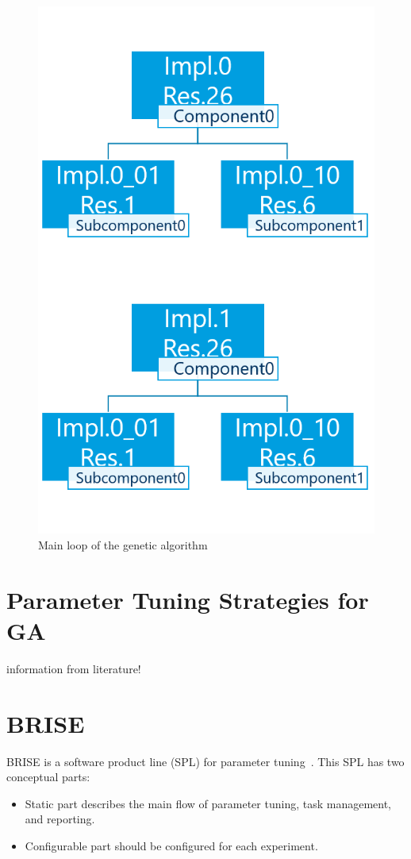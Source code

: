 \begin{figure}
	\centering
	\includegraphics[width=\textwidth]{images/GeneticSolverMutation.png}
	\caption{Main loop of the genetic algorithm}
	\label{fig:GeneticSolverMutation}
\end{figure}

\section{Parameter Tuning Strategies for GA}
information from literature!

\section{BRISE}
BRISE is a software product line (SPL) for parameter tuning~\cite{pukhkaiev19}.
This SPL has two conceptual parts:
\begin{itemize}
	\item Static part describes the main flow of parameter tuning, task management, and reporting.
	\item Configurable part should be configured for each experiment.
\end{itemize}

